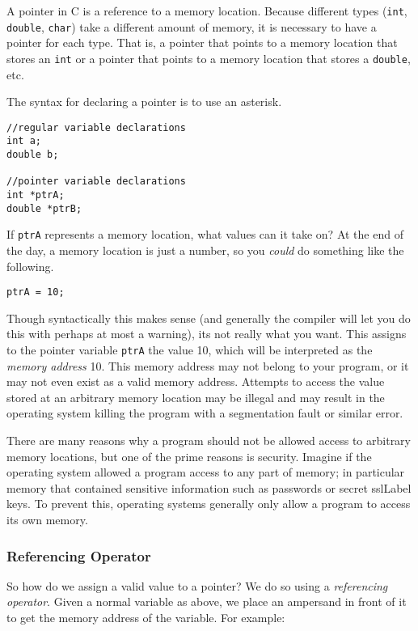 A \gls{pointer} in C is a reference to a memory location.  
Because different types (\texttt{int}, \texttt{double}, 
\texttt{char}) take a different amount of memory, it is
necessary to have a pointer for each type.  That is, a pointer
that points to a memory location that stores an \texttt{int}
or a pointer that points to a memory location that stores a 
\texttt{double}, etc.

The syntax for declaring a pointer is to use an asterisk.

\begin{verbatim}
//regular variable declarations
int a;
double b;

//pointer variable declarations
int *ptrA;
double *ptrB;
\end{verbatim}

If \texttt{ptrA} represents a memory location, what values can
it take on?  At the end of the day, a memory location is just a number, 
so you \emph{could} do something like the following.

\texttt{ptrA = 10;} 

Though syntactically this makes sense (and generally the compiler 
will let you do this with perhaps at most a warning), its not really what you want.  
This assigns to the pointer variable \texttt{ptrA} the value 10, 
which will be interpreted as the \emph{memory address} 10.  This
memory address may not belong to your program, or it may not even
exist as a valid memory address.  Attempts to access the value stored
at an arbitrary memory location may be illegal and may result in the
operating system killing the program with a \gls{segmentation fault}
or similar error.

There are many reasons why a program should not be allowed 
access to arbitrary memory locations, but one of the prime reasons
is security.  Imagine if the operating system allowed a program 
access to any part of memory; in particular memory that contained
sensitive information such as passwords or secret \gls{sslLabel} 
keys.  To prevent this, operating systems generally only allow a
program to access its own memory.

\subsubsection{Referencing Operator}

So how do we assign a valid value to a pointer?  We do so using
a \emph{referencing operator}.  Given a normal variable as above,
we place an ampersand in front of it to get the memory address of
the variable.  For example:

